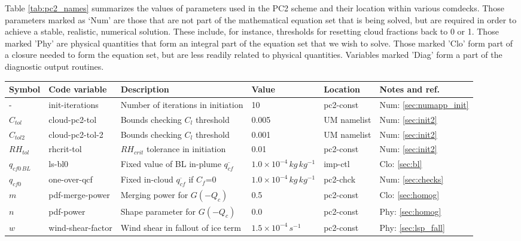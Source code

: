 \documentclass{UMDP_article}
\begin{document}
Table \ref{tab:pc2_names} summarizes the values of parameters used in the PC2
scheme and their location within various comdecks. Those parameters marked
as `Num' are those that are not part of the mathematical equation
set that is being solved, but are required in order to achieve a stable,
realistic, numerical solution. These include, for instance, thresholds for
resetting cloud fractions back to 0 or 1. Those marked 'Phy' are physical
quantities that form an integral part of the equation set that we wish to solve.
Those marked 'Clo' form part of a closure needed to form the equation
set, but are less readily related to physical quantities. 
Variables marked 'Diag' form a part of the diagnostic output routines.
\begin{table}[ht]
\begin{center}
\footnotesize
\begin{tabular}{llllll}
\hline
Symbol      & Code variable   & Description                           & Value     & Location  & Notes and ref.            \\ \hline
-           & init-iterations & Number of iterations in initiation    & 10        & pc2-const  & Num: \ref{sec:numapp_init}     \\
$C_{tol}$   & cloud-pc2-tol   & Bounds checking $C_l$ threshold       & 0.005     & UM namelist  & Num: \ref{sec:init2}     \\
$C_{tol 2}$ & cloud-pc2-tol-2 & Bounds checking $C_l$ threshold       & 0.001     & UM namelist  & Num: \ref{sec:init2}     \\
$RH_{tol}$  & rhcrit-tol      & $RH_{crit}$ tolerance in initiation   & 0.01      & pc2-const  & Num: \ref{sec:init2}     \\
$q_{cf0 \, BL}$ & ls-bl0      & Fixed value of BL in-plume $\overline{q_{cf}}$  & $1.0 \times 10^{-4} \, kg \, kg^{-1}$ & imp-ctl  & Clo: \ref{sec:bl}       \\
$q_{cf0}$   & one-over-qcf    & Fixed in-cloud $\overline{q_{cf}}$ if $C_f$=0   & $1.0 \times 10^{-4} \, kg \, kg^{-1}$ & pc2-chck & Num: \ref{sec:checks}   \\
$m$         & pdf-merge-power & Merging power for $G(-Q_c)$           & 0.5       & pc2-const  & Clo:  \ref{sec:homog}     \\
$n$         & pdf-power       & Shape parameter for $G(-Q_c)$         & 0.0       & pc2-const  & Phy:  \ref{sec:homog}     \\
$w$         & wind-shear-factor & Wind shear in fallout of ice term   & $1.5 \times 10^{-4} \, s^{-1}$               & pc2-const & Phy: \ref{sec:lsp_fall} \\

\end{tabular}
\end{center}
\end{table}
\end{document}
